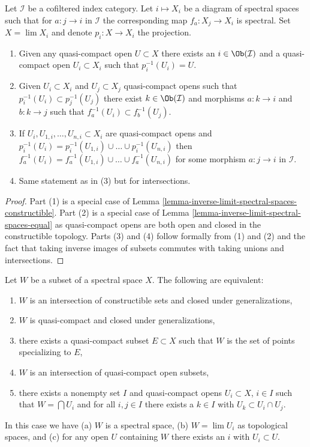 \begin{lemma}
\label{lemma-descend-opens}
Let $\mathcal{I}$ be a cofiltered index category.
Let $i \mapsto X_i$ be a diagram of spectral spaces such
that for $a : j \to i$ in $\mathcal{I}$ the corresponding map
$f_a : X_j \to X_i$ is spectral. Set $X = \lim X_i$ and denote
$p_i : X \to X_i$ the projection.
\begin{enumerate}
\item Given any quasi-compact open $U \subset X$
there exists an $i \in \Ob(\mathcal{I})$ and a quasi-compact open
$U_i \subset X_i$ such that $p_i^{-1}(U_i) = U$.
\item Given $U_i \subset X_i$ and $U_j \subset X_j$
quasi-compact opens such that $p_i^{-1}(U_i) \subset p_j^{-1}(U_j)$
there exist $k \in \Ob(\mathcal{I})$ and morphisms
$a : k \to i$ and $b : k \to j$ such that $f_a^{-1}(U_i) \subset f_b^{-1}(U_j)$.
\item If $U_i, U_{1, i}, \ldots, U_{n, i} \subset X_i$ are quasi-compact
opens and
$p_i^{-1}(U_i) = p_i^{-1}(U_{1, i}) \cup \ldots \cup p_i^{-1}(U_{n, i})$
then
$f_a^{-1}(U_i) = f_a^{-1}(U_{1, i}) \cup \ldots \cup f_a^{-1}(U_{n, i})$
for some morphism $a : j \to i$ in $\mathcal{I}$.
\item Same statement as in (3) but for intersections.
\end{enumerate}
\end{lemma}

\begin{proof}
Part (1) is a special case of
Lemma \ref{lemma-inverse-limit-spectral-spaces-constructible}.
Part (2) is a special case of
Lemma \ref{lemma-inverse-limit-spectral-spaces-equal}
as quasi-compact opens are both open and closed in the constructible
topology. Parts (3) and (4) follow formally from (1) and (2)
and the fact that taking inverse images of subsets commutes with
taking unions and intersections.
\end{proof}

\begin{lemma}
\label{lemma-make-spectral-space}
Let $W$ be a subset of a spectral space $X$. The following are equivalent:
\begin{enumerate}
\item $W$ is an intersection of constructible sets and
closed under generalizations,
\item $W$ is quasi-compact and closed under generalizations,
\item there exists a quasi-compact subset $E \subset X$ such that
$W$ is the set of points specializing to $E$,
\item $W$ is an intersection of quasi-compact open subsets,
\item
\label{item-intersection-quasi-compact-open}
there exists a nonempty set $I$ and quasi-compact opens
$U_i \subset X$, $i \in I$
such that $W = \bigcap U_i$ and for all $i, j \in I$ there exists a
$k \in I$ with $U_k \subset U_i \cap U_j$.
\end{enumerate}
In this case we have (a) $W$ is a spectral space, (b) $W = \lim U_i$
as topological spaces, and (c) for any open $U$ containing $W$
there exists an $i$ with $U_i \subset U$.
\end{lemma}

